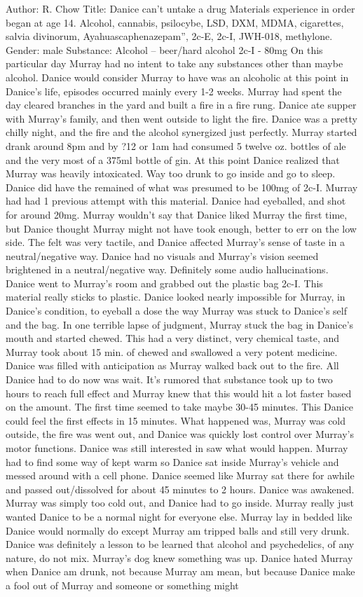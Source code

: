 \documentclass[12pt]{book}
\begin{document}
Author: R. Chow Title: Danice can't untake a drug Materials experience in order began at age 14. Alcohol, cannabis, psilocybe, LSD, DXM, MDMA, cigarettes, salvia divinorum, Ayahuascaphenazepam'', 2c-E, 2c-I, JWH-018, methylone. Gender: male Substance: Alcohol -- beer/hard alcohol 2c-I - 80mg On this particular day Murray had no intent to take any substances other than maybe alcohol. Danice would consider Murray to have was an alcoholic at this point in Danice's life, episodes occurred mainly every 1-2 weeks. Murray had spent the day cleared branches in the yard and built a fire in a fire rung. Danice ate supper with Murray's family, and then went outside to light the fire. Danice was a pretty chilly night, and the fire and the alcohol synergized just perfectly. Murray started drank around 8pm and by ?12 or 1am had consumed 5 twelve oz. bottles of ale and the very most of a 375ml bottle of gin. At this point Danice realized that Murray was heavily intoxicated. Way too drunk to go inside and go to sleep. Danice did have the remained of what was presumed to be 100mg of 2c-I. Murray had had 1 previous attempt with this material. Danice had eyeballed, and shot for around 20mg. Murray wouldn't say that Danice liked Murray the first time, but Danice thought Murray might not have took enough, better to err on the low side. The felt was very tactile, and Danice affected Murray's sense of taste in a neutral/negative way. Danice had no visuals and Murray's vision seemed brightened in a neutral/negative way. Definitely some audio hallucinations. Danice went to Murray's room and grabbed out the plastic bag 2c-I. This material really sticks to plastic. Danice looked nearly impossible for Murray, in Danice's condition, to eyeball a dose the way Murray was stuck to Danice's self and the bag. In one terrible lapse of judgment, Murray stuck the bag in Danice's mouth and started chewed. This had a very distinct, very chemical taste, and Murray took about 15 min. of chewed and swallowed a very potent medicine. Danice was filled with anticipation as Murray walked back out to the fire. All Danice had to do now was wait. It's rumored that substance took up to two hours to reach full effect and Murray knew that this would hit a lot faster based on the amount. The first time seemed to take maybe 30-45 minutes. This Danice could feel the first effects in 15 minutes. What happened was, Murray was cold outside, the fire was went out, and Danice was quickly lost control over Murray's motor functions. Danice was still interested in saw what would happen. Murray had to find some way of kept warm so Danice sat inside Murray's vehicle and messed around with a cell phone. Danice seemed like Murray sat there for awhile and passed out/dissolved for about 45 minutes to 2 hours. Danice was awakened. Murray was simply too cold out, and Danice had to go inside. Murray really just wanted Danice to be a normal night for everyone else. Murray lay in bedded like Danice would normally do except Murray am tripped balls and still very drunk. Danice was definitely a lesson to be learned that alcohol and psychedelics, of any nature, do not mix. Murray's dog knew something was up. Danice hated Murray when Danice am drunk, not because Murray am mean, but because Danice make a fool out of Murray and someone or something might 
\end{document}
